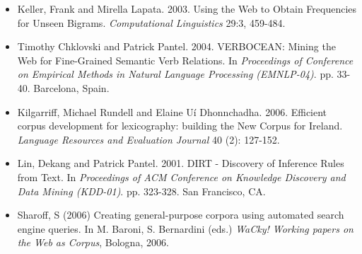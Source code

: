 \documentclass[a4paper,landscape,headrule,footrule,xetex]{foils}
\begin{document}

\begin{itemize}
\item Keller, Frank and Mirella Lapata. 2003. Using the Web to Obtain
  Frequencies for Unseen Bigrams. \textit{Computational Linguistics}
  29:3, 459-484.
\item Timothy Chklovski and Patrick Pantel. 2004. VERBOCEAN: Mining
  the Web for Fine-Grained Semantic Verb Relations. In
  \textit{Proceedings of Conference on Empirical Methods in Natural
    Language Processing (EMNLP-04)}. pp. 33-40. Barcelona, Spain.
\item Kilgarriff, Michael Rundell and Elaine Uí
  Dhonnchadha. 2006. Efficient corpus development for lexicography:
  building the New Corpus for Ireland. \textit{Language Resources and
    Evaluation Journal} 40 (2): 127-152.
\newpage
\item Lin, Dekang and Patrick Pantel. 2001. DIRT - Discovery of
  Inference Rules from Text. In \textit{Proceedings of ACM Conference on
  Knowledge Discovery and Data Mining (KDD-01)}. pp. 323-328. San
  Francisco, CA.
\item Sharoff, S (2006) Creating general-purpose corpora using automated search engine queries. In M. Baroni, S. Bernardini (eds.) \textit{WaCky! Working papers on the Web as Corpus}, Bologna, 2006.

\end{itemize}

\end{document}
